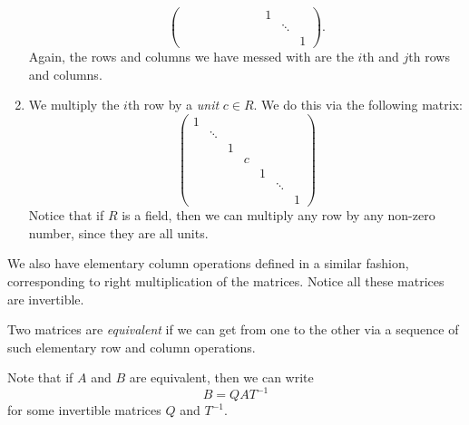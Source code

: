 \documentclass[a4paper]{article}
\begin{document}
\begin{defi}
\begin{enumerate}
\[\begin{pmatrix}
          & & & & & & & & 1\\
          & & & & & & & & & \ddots\\
          & & & & & & & & & & 1
        \end{pmatrix}.
      \]
      Again, the rows and columns we have messed with are the $i$th and $j$th rows and columns.
    \item We multiply the $i$th row by a \emph{unit} $c \in R$. We do this via the following matrix:
      \[
        \begin{pmatrix}
          1 \\
          & \ddots\\
          & & 1 \\
          & & & c\\
          & & & & 1\\
          & & & & & \ddots\\
          & & & & & & 1
        \end{pmatrix}
      \]
      Notice that if $R$ is a field, then we can multiply any row by any non-zero number, since they are all units.
  \end{enumerate}
  We also have elementary column operations defined in a similar fashion, corresponding to right multiplication of the matrices. Notice all these matrices are invertible.
\end{defi}

\begin{defi}
  Two matrices are \emph{equivalent} if we can get from one to the other via a sequence of such elementary row and column operations.
\end{defi}

Note that if $A$ and $B$ are equivalent, then we can write
\[
  B = QAT^{-1}
\]
for some invertible matrices $Q$ and $T^{-1}$.
\end{document}
